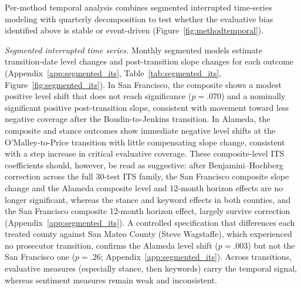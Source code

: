 \documentclass[12pt, letterpaper]{article}
\begin{document}
Per-method temporal analysis combines segmented interrupted time-series modeling with quarterly decomposition to test whether the evaluative bias identified above is stable or event-driven (Figure~\ref{fig:methodtemporal}).

\emph{Segmented interrupted time series.} Monthly segmented models estimate transition-date level changes and post-transition slope changes for each outcome (Appendix~\ref{app:segmented_its}, Table~\ref{tab:segmented_its}, Figure~\ref{fig:segmented_its}). In San Francisco, the composite shows a modest positive level shift that does not reach significance ($p = .070$) and a nominally significant positive post-transition slope, consistent with movement toward less negative coverage after the Boudin-to-Jenkins transition. In Alameda, the composite and stance outcomes show immediate negative level shifts at the O'Malley-to-Price transition with little compensating slope change, consistent with a step increase in critical evaluative coverage. These composite-level ITS coefficients should, however, be read as suggestive: after Benjamini--Hochberg correction across the full 30-test ITS family, the San Francisco composite slope change and the Alameda composite level and 12-month horizon effects are no longer significant, whereas the stance and keyword effects in both counties, and the San Francisco composite 12-month horizon effect, largely survive correction (Appendix~\ref{app:segmented_its}). A controlled specification that differences each treated county against San Mateo County (Steve Wagstaffe), which experienced no prosecutor transition, confirms the Alameda level shift ($p = .003$) but not the San Francisco one ($p = .26$; Appendix~\ref{app:segmented_its}). Across transitions, evaluative measures (especially stance, then keywords) carry the temporal signal, whereas sentiment measures remain weak and inconsistent.
\end{document}
